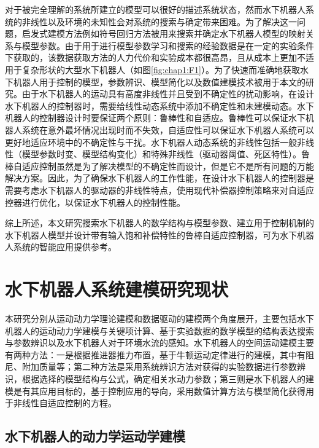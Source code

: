 对于被完全理解的系统所建立的模型可以很好的描述系统状态，然而水下机器人系统的非线性以及环境的未知性会对系统的搜索与确定带来困难。为了解决这一问题，启发式建模方法例如符号回归方法被用来搜索并确定水下机器人模型的映射关系与模型参数。由于用于进行模型参数学习和搜索的经验数据是在一定的实验条件下获取的，该数据获取方法的人力代价和实验成本都很高昂，且从成本上更加不适用于复杂形状的大型水下机器人（如图\ref{fig:chap1:F1}）\cite{yang2014modeling}。为了快速而准确地获取水下机器人用于控制的模型，参数辨识、模型简化以及数值建模技术被用于本文的研究。由于水下机器人的运动具有高度非线性并且受到不确定性的扰动影响，在设计水下机器人的控制器时，需要给线性动态系统中添加不确定性和未建模动态\cite{valladarez2015adaptive}。水下机器人的控制器设计时要保证两个原则：鲁棒性和自适应。鲁棒性可以保证水下机器人系统在意外最坏情况出现时而不失效，自适应性可以保证水下机器人系统可以更好地适应环境中的不确定性与干扰。水下机器人动态系统的非线性包括一般非线性（模型参数时变、模型结构变化）和特殊非线性（驱动器阈值、死区特性）\cite{Wu2018Pitch}。鲁棒自适应控制虽然是为了解决模型的不确定性而设计，但是它不是所有问题的万能解决方案\cite{lavretsky2013robust}。因此，为了确保水下机器人的工作性能，在设计水下机器人的控制器是需要考虑水下机器人的驱动器的非线性特点，使用现代补偿器控制策略来对自适应控器进行优化，以保证水下机器人的控制性能。

综上所述，本文研究搜索水下机器人的数学结构与模型参数、建立用于控制机制的水下机器人模型并设计带有输入饱和补偿特性的鲁棒自适应控制器，可为水下机器人系统的智能应用提供参考。


\section{水下机器人系统建模研究现状 }

本研究分别从运动动力学理论建模和数据驱动的建模两个角度展开，主要包括水下机器人的运动动力学建模与关键项计算、基于实验数据的数学模型的结构表达搜索与参数辨识以及水下机器人对于环境水流的感知。水下机器人的空间运动建模主要有两种方法：一是根据推进器推力布置，基于牛顿运动定律进行的建模，其中有阻尼、附加质量等；第二种方法是采用系统辨识方法对获得的实验数据进行参数辨识，根据选择的模型结构与公式，确定相关水动力参数；第三则是水下机器人的建模是有其应用目标的，基于控制应用的导向，采用数值计算方法与模型简化获得用于非线性自适应控制的方程。

\subsection{水下机器人的动力学运动学建模  }

